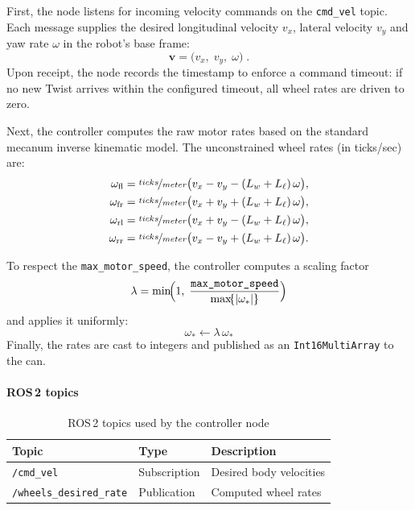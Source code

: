 First, the node listens for incoming velocity commands on the \texttt{cmd\_vel} topic. Each message supplies the desired longitudinal velocity $v_x$, lateral velocity $v_y$ and yaw rate $\omega$ in the robot's base frame:
\begin{equation*}
  \mathbf{v} = \bigl(v_x,\;v_y,\;\omega\bigr)\;.
\end{equation*}
Upon receipt, the node records the timestamp to enforce a command timeout: if no new Twist arrives within the configured timeout, all wheel rates are driven to zero.

Next, the controller computes the raw motor rates based on the standard mecanum inverse kinematic model. The unconstrained wheel rates (in ticks/sec) are:
\begin{equation}
  \begin{aligned}
    \omega_{\mathrm{fl}} & = \nicefrac{ticks}{meter}\bigl(v_x - v_y - (L_w+L_\ell)\,\omega\bigr), \\
    \omega_{\mathrm{fr}} & = \nicefrac{ticks}{meter}\bigl(v_x + v_y + (L_w+L_\ell)\,\omega\bigr), \\
    \omega_{\mathrm{rl}} & = \nicefrac{ticks}{meter}\bigl(v_x + v_y - (L_w+L_\ell)\,\omega\bigr), \\
    \omega_{\mathrm{rr}} & = \nicefrac{ticks}{meter}\bigl(v_x - v_y + (L_w+L_\ell)\,\omega\bigr).
  \end{aligned}
\end{equation}

To respect the \texttt{max\_motor\_speed}, the controller computes a scaling factor
\[
  \lambda = \min\!\Bigl(1,\;\frac{\texttt{max\_motor\_speed}}{\max\!\{|\omega_{*}|\}}\Bigr)
\]
and applies it uniformly:
\[
  \omega_* \leftarrow \lambda \,\omega_*
\]
Finally, the rates are cast to integers and published as an \texttt{Int16MultiArray} to the \gls{can}.

\paragraph*{ROS\,2 topics}
\begin{table}[H]
  \centering
  \begin{tabular}{lll}
    \toprule
    \textbf{Topic}                  & \textbf{Type} & \textbf{Description}    \\
    \midrule
    \texttt{/cmd\_vel}              & Subscription  & Desired body velocities \\
    \texttt{/wheels\_desired\_rate} & Publication   & Computed wheel rates    \\
    \bottomrule
  \end{tabular}
  \caption{ROS\,2 topics used by the controller node}
  \label{tab:ctrl-topics}
\end{table}

